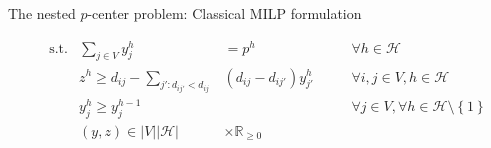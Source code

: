 \documentclass[utf8,aspectratio=169,ngerman,english]{beamer}
\newcommand{\inH}{h \in \mathcal H}
\begin{document}
\begin{frame}{The nested $p$-center problem: Classical MILP formulation}
\begin{minipage}[t]{0.59\linewidth}
\begin{block}
\begin{subequations}
\begin{alignat}{4}
                     & \text{ s.t.} & \sum_{j \in V}y_{j}^h                                                                     & =     p^{h}                   &  &  & \forall \inH                                                \\
                     &              & z^{h} \geq d_{ij} - \sum_{j':d_{ij'} < d_{ij}}                                            & (d_{ij} - d_{ij'})y_{j'}^h \; &  &  & \forall i,j \in V, h \in \mathcal H                         \\
                     &              & y_{j}^h \geq  y_j^{h-1}                                                                   &                               &  &  & \forall j \in V, \forall \inH \setminus \left \{1 \right \} \\
                     &              & (y,z)                                           \in \left|V\right|\left|\mathcal H\right| & \times \mathbb{R}_{\geq 0}    &  &  &
                \end{alignat}
            \end{subequations}
        \end{block}
    \end{minipage}
\end{frame}
\end{document}
